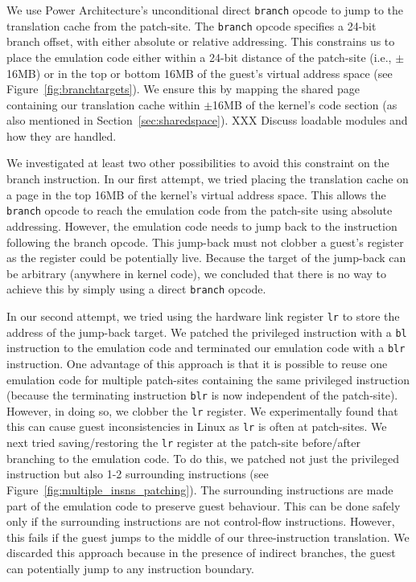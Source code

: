 \documentclass[10pt,twocolumn]{article}
\begin{document}
We use Power Architecture's unconditional direct {\tt branch} opcode to jump to the
translation cache from the patch-site. The {\tt branch} opcode specifies a 24-bit
branch offset, with either absolute or relative addressing. This constrains us
to place the emulation code either within a 24-bit distance of the patch-site (i.e.,
$\pm$16MB) or in the top or bottom 16MB of the guest's virtual address
space (see Figure~\ref{fig:branchtargets}). We ensure this by mapping the shared
page containing our translation cache within $\pm$16MB of the kernel's code
section (as also mentioned in Section~\ref{sec:sharedspace}). XXX Discuss loadable
modules and how they are handled.

We investigated at least two other possibilities to avoid this constraint
on the branch instruction. In our first attempt, we tried placing the
translation cache on a page in the top 16MB of the kernel's virtual address
space. This allows the {\tt branch} opcode to reach the emulation code from
the patch-site using absolute addressing. However, the emulation code needs to
jump back to the instruction following the branch opcode. This jump-back must not
clobber a guest's register as the register could be potentially live. Because
the target of the jump-back can be arbitrary (anywhere in kernel code), we concluded
that there is no way to achieve this by simply using a direct {\tt branch} opcode.

In our second attempt, we tried using the hardware link register {\tt lr} to store
the address
of the jump-back target. We patched the privileged instruction with a {\tt bl}
instruction to the emulation code and terminated our emulation code with a {\tt blr}
instruction. One advantage of this approach is that it is possible to
reuse one emulation code
for multiple patch-sites containing the same privileged instruction (because the
terminating instruction {\tt blr} is now independent of the patch-site). However, in
doing so, we
clobber the {\tt lr} register. We experimentally found that this can cause
guest inconsistencies in Linux as {\tt lr} is often at patch-sites.
We next tried saving/restoring the
{\tt lr} register at the patch-site before/after branching to the emulation code.
To do this, we patched not just the privileged instruction but also 1-2
surrounding instructions (see Figure~\ref{fig:multiple_insns_patching}). The
surrounding instructions are made part of the emulation code to preserve
guest behaviour. This can
be done safely only if the surrounding instructions are not control-flow instructions.
However, this fails if the guest jumps to the middle of our
three-instruction translation. We discarded this approach because in the presence
of indirect branches, the guest can potentially jump to any instruction boundary.
\end{document}
